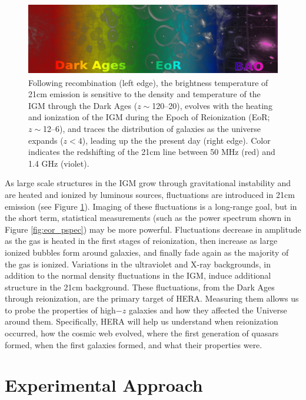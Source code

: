 \documentclass[preprint]{aastex}
\begin{document}
\begin{figure}[!ht]\centering
\includegraphics[height=1.25in]{plots/21cm_cosmo.jpg}
\caption{\small
Following recombination (left edge), the brightness temperature
of 21cm emission is sensitive to the density and temperature of the IGM
through the Dark Ages ($z\!\sim$120--20), evolves with the heating and
ionization of the IGM during the Epoch of Reionization (EoR; $z\!\sim$12--6), and
traces the distribution of galaxies as the universe expands ($z<4$),
leading up the the present day (right edge).  Color indicates
the redshifting of the 21cm line between 50 MHz (red) and 1.4 GHz (violet).
}\label{fig:21cm_cosmo}
\end{figure}

As large scale structures in the IGM grow through gravitational
instability and are heated and ionized by luminous sources, fluctuations
are introduced in 21cm emission (see Figure \ref{fig:21cm_cosmo}).  
Imaging of these fluctuations is a long-range goal, but in the short term, statistical
measurements (such as the power spectrum shown in Figure \ref{fig:eor_pspec}) may be more powerful.  
Fluctuations decrease in amplitude 
as the gas is heated in the first stages of
reionization, then increase as large ionized bubbles form around galaxies, and finally fade again
as the majority of the gas is ionized.
Variations in the ultraviolet and
X-ray backgrounds, in addition to the normal density fluctuations in the IGM,
induce additional structure in the 21cm background. These fluctuations, from the Dark Ages
through reionization, are the primary target of HERA. Measuring them allows us to
probe the properties of high$-z$ galaxies and how they affected the Universe
around them.  Specifically, HERA will help us understand when reionization
occurred, how the cosmic web evolved, where the first generation of quasars
formed, when the first galaxies formed, and what their properties were.

\vspace{-0.25in}
\section{Experimental Approach}
\end{document}
